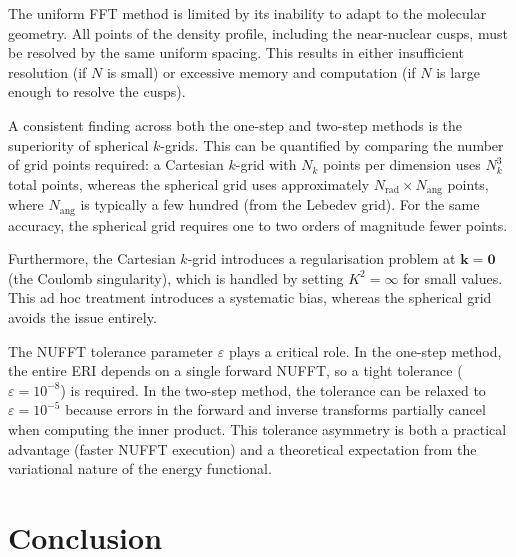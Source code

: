 \documentclass[12pt,a4paper]{article}
\begin{document}
The uniform FFT method is limited by its inability to adapt to the molecular geometry. All points of the density profile, including the near-nuclear cusps, must be resolved by the same uniform spacing. This results in either insufficient resolution (if $N$ is small) or excessive memory and computation (if $N$ is large enough to resolve the cusps).

A consistent finding across both the one-step and two-step methods is the superiority of spherical $k$-grids. This can be quantified by comparing the number of grid points required: a Cartesian $k$-grid with $N_k$ points per dimension uses $N_k^3$ total points, whereas the spherical grid uses approximately $N_{\text{rad}} \times N_{\text{ang}}$ points, where $N_{\text{ang}}$ is typically a few hundred (from the Lebedev grid). For the same accuracy, the spherical grid requires one to two orders of magnitude fewer points.

Furthermore, the Cartesian $k$-grid introduces a regularisation problem at $\mathbf{k} = \mathbf{0}$ (the Coulomb singularity), which is handled by setting $K^2 = \infty$ for small values. This ad hoc treatment introduces a systematic bias, whereas the spherical grid avoids the issue entirely.

The NUFFT tolerance parameter $\varepsilon$ plays a critical role. In the one-step method, the entire ERI depends on a single forward NUFFT, so a tight tolerance ($\varepsilon = 10^{-8}$) is required. In the two-step method, the tolerance can be relaxed to $\varepsilon = 10^{-5}$ because errors in the forward and inverse transforms partially cancel when computing the inner product. This tolerance asymmetry is both a practical advantage (faster NUFFT execution) and a theoretical expectation from the variational nature of the energy functional.


\section{Conclusion}
\label{sec:conclusion}
\end{document}
